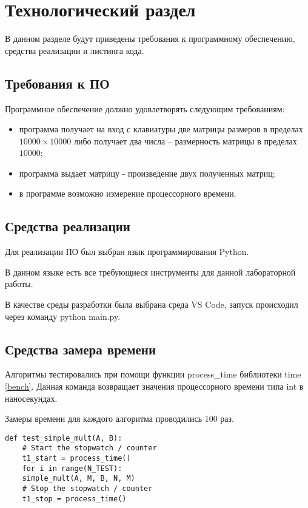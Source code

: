 \chapter{Технологический раздел}

В данном разделе будут приведены требования к программному обеспечению, средства реализации и листинга кода.

\section{Требования к ПО}

Программное обеспечение должно удовлетворять следующим требованиям:
\begin{itemize}
	\item программа получает на вход с клавиатуры две матрицы размеров в пределах $10000 \times 10000$ либо получает два числа -- размерность матрицы в пределах $10000$;
	\item программа выдает матрицу - произведение двух полученных матриц;
	\item в программе возможно измерение процессорного времени.
\end{itemize}

\section{Средства реализации} 
Для реализации ПО был выбран язык программирования Python\cite{python}. 

В данном языке есть все требующиеся инструменты для данной лабораторной работы.

В качестве среды разработки была выбрана среда VS Code\cite{vscode}, запуск происходил через команду python main.py.

\section{Средства замера времени}

Алгоритмы тестировались при помощи функции process\_time библиотеки time \ref{bench}. Данная команда возвращает значения процессорного времени типа int в наносекундах.

Замеры времени для каждого алгоритма проводились 100 раз.

\begin{lstlisting}[label=bench,caption=Пример теста эффективности]
	def test_simple_mult(A, B):
	# Start the stopwatch / counter 
	t1_start = process_time() 
	for i in range(N_TEST):
	simple_mult(A, M, B, N, M)
	# Stop the stopwatch / counter
	t1_stop = process_time()
\end{lstlisting}



